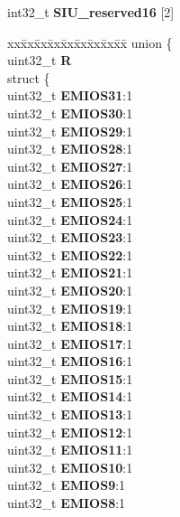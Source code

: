 \begin{DoxyCompactItemize}
\begin{tabbing}
\end{tabbing}\item 
\mbox{\label{structSIU__tag_a4487ad985e5b4f10cd5dbe8cfeebfef7}} 
int32\+\_\+t {\bfseries S\+I\+U\+\_\+reserved16} \mbox{[}2\mbox{]}
\item 
\mbox{\label{structSIU__tag_aec3318ad00334c9c4d66810711a05abf}} 
\begin{tabbing}
xx\=xx\=xx\=xx\=xx\=xx\=xx\=xx\=xx\=\kill
union \{\\
\>uint32\_t {\bfseries R}\\
\>struct \{\\
\>\>uint32\_t {\bfseries EMIOS31}:1\\
\>\>uint32\_t {\bfseries EMIOS30}:1\\
\>\>uint32\_t {\bfseries EMIOS29}:1\\
\>\>uint32\_t {\bfseries EMIOS28}:1\\
\>\>uint32\_t {\bfseries EMIOS27}:1\\
\>\>uint32\_t {\bfseries EMIOS26}:1\\
\>\>uint32\_t {\bfseries EMIOS25}:1\\
\>\>uint32\_t {\bfseries EMIOS24}:1\\
\>\>uint32\_t {\bfseries EMIOS23}:1\\
\>\>uint32\_t {\bfseries EMIOS22}:1\\
\>\>uint32\_t {\bfseries EMIOS21}:1\\
\>\>uint32\_t {\bfseries EMIOS20}:1\\
\>\>uint32\_t {\bfseries EMIOS19}:1\\
\>\>uint32\_t {\bfseries EMIOS18}:1\\
\>\>uint32\_t {\bfseries EMIOS17}:1\\
\>\>uint32\_t {\bfseries EMIOS16}:1\\
\>\>uint32\_t {\bfseries EMIOS15}:1\\
\>\>uint32\_t {\bfseries EMIOS14}:1\\
\>\>uint32\_t {\bfseries EMIOS13}:1\\
\>\>uint32\_t {\bfseries EMIOS12}:1\\
\>\>uint32\_t {\bfseries EMIOS11}:1\\
\>\>uint32\_t {\bfseries EMIOS10}:1\\
\>\>uint32\_t {\bfseries EMIOS9}:1\\
\>\>uint32\_t {\bfseries EMIOS8}:1\\

\end{tabbing}
\end{DoxyCompactItemize}
